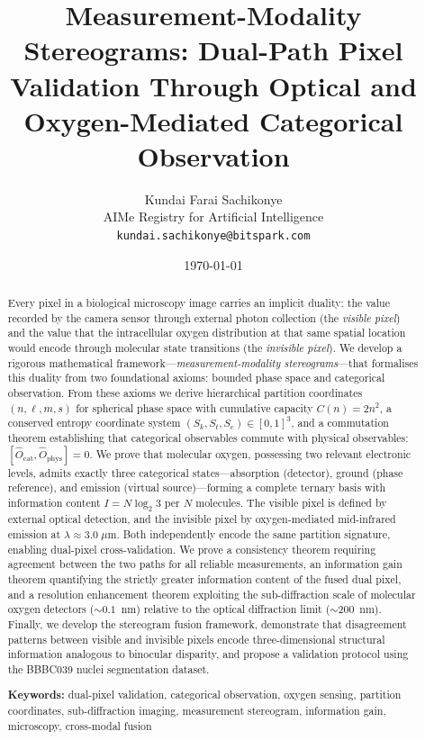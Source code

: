 \documentclass[11pt,twocolumn,a4paper]{article}
\title{\textbf{Measurement-Modality Stereograms: Dual-Path Pixel Validation Through Optical and Oxygen-Mediated Categorical Observation}}
\author{
Kundai Farai Sachikonye\\
AIMe Registry for Artificial Intelligence\\
\texttt{kundai.sachikonye@bitspark.com}
}
\date{\today}
\newcommand{\Ocat}{\hat{O}_{\mathrm{cat}}}
\newcommand{\Ophys}{\hat{O}_{\mathrm{phys}}}
\newcommand{\Sk}{S_k}
\newcommand{\St}{S_t}
\newcommand{\Se}{S_e}
\begin{document}
\maketitle
\thispagestyle{fancy}

\begin{abstract}
Every pixel in a biological microscopy image carries an implicit duality: the value recorded by the camera sensor through external photon collection (the \emph{visible pixel}) and the value that the intracellular oxygen distribution at that same spatial location would encode through molecular state transitions (the \emph{invisible pixel}).
We develop a rigorous mathematical framework---\emph{measurement-modality stereograms}---that formalises this duality from two foundational axioms: bounded phase space and categorical observation.
From these axioms we derive hierarchical partition coordinates $(n, \ell, m, s)$ for spherical phase space with cumulative capacity $C(n)=2n^2$, a conserved entropy coordinate system $(\Sk, \St, \Se) \in [0,1]^3$, and a commutation theorem establishing that categorical observables commute with physical observables: $[\Ocat, \Ophys] = 0$.
We prove that molecular oxygen, possessing two relevant electronic levels, admits exactly three categorical states---absorption (detector), ground (phase reference), and emission (virtual source)---forming a complete ternary basis with information content $I = N\log_2 3$ per $N$ molecules.
The visible pixel is defined by external optical detection, and the invisible pixel by oxygen-mediated mid-infrared emission at $\lambda \approx 3.0\;\mu$m.
Both independently encode the same partition signature, enabling dual-pixel cross-validation.
We prove a consistency theorem requiring agreement between the two paths for all reliable measurements, an information gain theorem quantifying the strictly greater information content of the fused dual pixel, and a resolution enhancement theorem exploiting the sub-diffraction scale of molecular oxygen detectors (${\sim}0.1$~nm) relative to the optical diffraction limit (${\sim}200$~nm).
Finally, we develop the stereogram fusion framework, demonstrate that disagreement patterns between visible and invisible pixels encode three-dimensional structural information analogous to binocular disparity, and propose a validation protocol using the BBBC039 nuclei segmentation dataset.

\medskip
\noindent\textbf{Keywords:} dual-pixel validation, categorical observation, oxygen sensing, partition coordinates, sub-diffraction imaging, measurement stereogram, information gain, microscopy, cross-modal fusion
\end{abstract}
\end{document}
